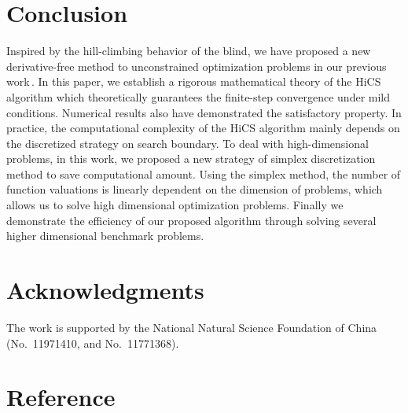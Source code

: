 \documentclass[final,1p,times]{elsarticle}
\begin{document}
\section{Conclusion}
\label{sec:conclusion}

Inspired by the hill-climbing behavior of the blind, we have
proposed a new derivative-free method to unconstrained
optimization problems in our previous work\,\cite{huang2017hill}. 
In this paper, we establish a rigorous mathematical theory of the HiCS
algorithm which theoretically guarantees the finite-step convergence
under mild conditions. Numerical results also have demonstrated
the satisfactory property. 
In practice, the computational complexity of the HiCS algorithm mainly
depends on the discretized strategy on search boundary.
To deal with high-dimensional problems, in this work, 
we proposed a new strategy of simplex
discretization method to save computational amount. Using the
simplex method, the number of function valuations is linearly
dependent on the dimension of problems,
which allows us to solve high dimensional optimization problems. 
Finally we demonstrate the efficiency of our proposed algorithm
through solving several higher dimensional benchmark problems.


\section*{Acknowledgments}
The work is supported by the National Natural Science
Foundation of China (No.~11971410, and
No.~11771368). 


%
%

\section*{Reference}
\end{document}
